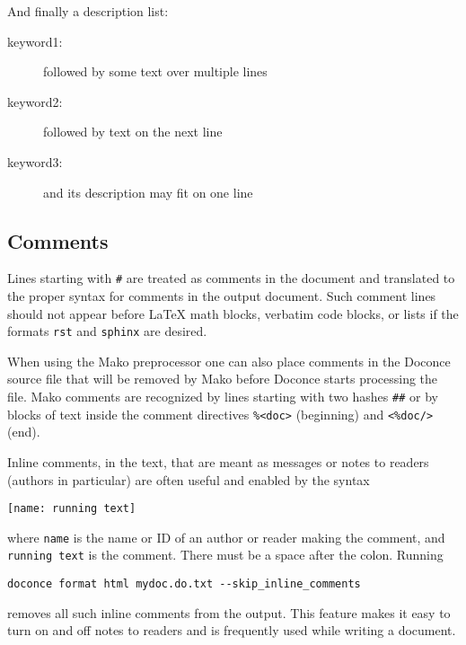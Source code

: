 \documentclass[twoside]{article}
\begin{document}
\noindent
And finally a description list:

\begin{description}
 \item[keyword1:] 
   followed by
   some text
   over multiple
   lines

 \item[keyword2:] 
   followed by text on the next line

 \item[keyword3:] 
   and its description may fit on one line
\end{description}

\noindent

\subsection{Comments}

Lines starting with {\fontsize{10pt}{10pt}\verb!#!} are treated as comments in the document and
translated to the proper syntax for comments in the output
document. Such comment lines should not appear before {\LaTeX} math
blocks, verbatim code blocks, or lists if the formats {\fontsize{10pt}{10pt}\verb!rst!} and
{\fontsize{10pt}{10pt}\verb!sphinx!} are desired.

When using the Mako preprocessor one can also place comments in
the Doconce source file that will be removed by Mako before
Doconce starts processing the file. Mako comments are recognized
by lines starting with two hashes {\fontsize{10pt}{10pt}\verb!##!} or by blocks of text
inside the comment directives {\fontsize{10pt}{10pt}\verb!%<doc>!} (beginning) and {\fontsize{10pt}{10pt}\verb!<%doc/>!} (end).

Inline comments, in the text, that are meant as messages or notes to readers
(authors in particular)
are often useful and enabled by the syntax
\begin{Verbatim}
[name: running text]
\end{Verbatim}
where {\fontsize{10pt}{10pt}\verb!name!} is the name or ID of an author or reader making the comment,
and {\fontsize{10pt}{10pt}\verb!running text!} is the comment. There must be a space after the colon.
Running
\begin{Verbatim}
doconce format html mydoc.do.txt --skip_inline_comments
\end{Verbatim}
removes all such inline comments from the output. This feature makes it easy
to turn on and off notes to readers and is frequently used while writing
a document.
\end{document}

